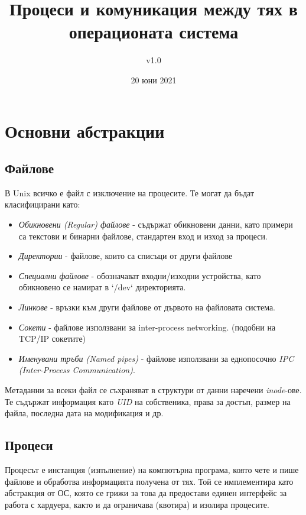 \documentclass[fleqn,12pt]{article}
\title{Процеси и комуникация между тях в операционата система}
\author{v1.0}
\date{20 юни 2021}
\begin{document}
\maketitle

\tableofcontents
\pagebreak

\section{Основни абстракции}

\subsection{Файлове}

В Unix всичко е файл с изключение на процесите. Те могат да бъдат класифицирани като:
\begin{itemize}
    \item \textit{Обикновени (Regular) файлове} - съдържат обикновени данни, като примери са текстови и бинарни файлове, стандартен вход и изход за процеси.
    \item \textit{Директории} - файлове, които са списъци от други файлове
    \item \textit{Специални файлове} - обозначават входни/изходни устройства, като обикновено се намират в `/dev` директорията.
    \item \textit{Линкове} - връзки към други файлове от дървото на файловата система.
    \item \textit{Сокети} - файлове използвани за inter-process networking. (подобни на TCP/IP сокетите)
    \item \textit{Именувани тръби (Named pipes)} - файлове използвани за еднопосочно \textit{IPC (Inter-Process Communication)}.
\end{itemize}

Метаданни за всеки файл се съхраняват в структури от данни наречени \textit{inode}-ове.
Те съдържат информация като \textit{UID} на собственика, права за достъп, размер на файла, последна дата на модификация и др.

\subsection{Процеси}

Процесът е инстанция (изпълнение) на компютърна програма, която чете и пише файлове и обработва информацията получена от тях.
Той се имплементира като абстракция от ОС, която се грижи за това да предостави единен интерфейс за работа с хардуера, както и да ограничава (квотира) и изолира процесите.
\end{document}
